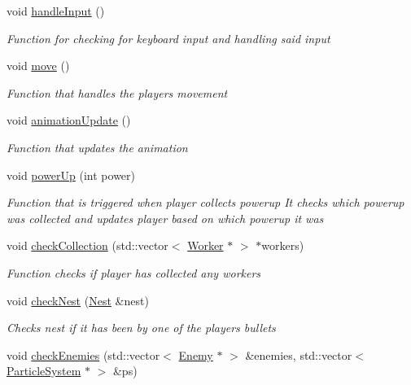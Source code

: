 \begin{DoxyCompactItemize}
void \mbox{\hyperlink{class_player_a3c2e7e40fe2018229d44168bd484c182}{handle\+Input}} ()
\begin{DoxyCompactList}\small\item\em Function for checking for keyboard input and handling said input \end{DoxyCompactList}\item 
void \mbox{\hyperlink{class_player_ae02ee46d8c20dd0697b975f935b09839}{move}} ()
\begin{DoxyCompactList}\small\item\em Function that handles the players movement \end{DoxyCompactList}\item 
void \mbox{\hyperlink{class_player_aa5083665c34ef45cf4a567433a31f9aa}{animation\+Update}} ()
\begin{DoxyCompactList}\small\item\em Function that updates the animation \end{DoxyCompactList}\item 
void \mbox{\hyperlink{class_player_af48714530f6a34bb3637d67edb781c70}{power\+Up}} (int power)
\begin{DoxyCompactList}\small\item\em Function that is triggered when player collects powerup It checks which powerup was collected and updates player based on which powerup it was \end{DoxyCompactList}\item 
void \mbox{\hyperlink{class_player_aca6122d4de9a1325f63e369769cc1239}{check\+Collection}} (std\+::vector$<$ \mbox{\hyperlink{class_worker}{Worker}} $\ast$ $>$ $\ast$workers)
\begin{DoxyCompactList}\small\item\em Function checks if player has collected any workers \end{DoxyCompactList}\item 
void \mbox{\hyperlink{class_player_a3fd7e9acb89b30b0976248c41ae2f8d3}{check\+Nest}} (\mbox{\hyperlink{class_nest}{Nest}} \&nest)
\begin{DoxyCompactList}\small\item\em Checks nest if it has been by one of the players bullets \end{DoxyCompactList}\item 
void \mbox{\hyperlink{class_player_a6054f91ea6df9f3b31d2a8ed9067d77e}{check\+Enemies}} (std\+::vector$<$ \mbox{\hyperlink{class_enemy}{Enemy}} $\ast$ $>$ \&enemies, std\+::vector$<$ \mbox{\hyperlink{class_particle_system}{Particle\+System}} $\ast$ $>$ \&ps)

\end{DoxyCompactItemize}
